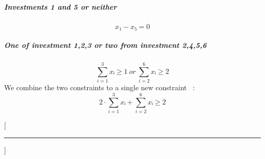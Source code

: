 \documentclass[a4paper, 12pt]{report}
\begin{document}
\subparagraph{Investments 1 and 5 or neither}
\[
    x₁ - x₅ = 0
\]

\subparagraph{One of investment 1,2,3 or two from investment 2,4,5,6}
\[
    ∑_{i=1}^{3} xᵢ ≥ 1 ~or~ ∑_{i=2}^{6} xᵢ ≥ 2
\]
We combine the two constraints to a single new constraint
~\cite{Informatik_Forum_Or_Constraints}:
\[
     2·∑_{i=1}^{3} xᵢ + ∑_{i=2}^{6} xᵢ ≥ 2
\]


\newpage
\titleformat{\chapter}{\sffamily\bfseries}{}{0pt}{}[{\color{aqua}\hrule}]
\printbibliography
\end{document}
